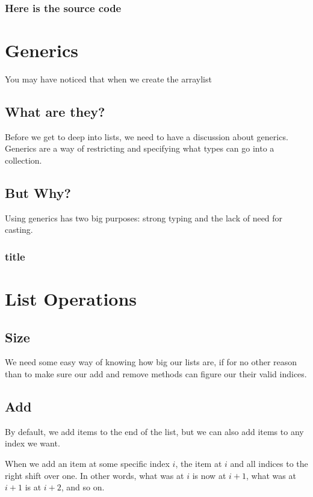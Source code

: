 \subsubsection*{Here is the source code}



\section{Generics}

You may have noticed that when we create the arraylist

\subsection{What are they?}


Before we get to deep into lists, we need to have a discussion about generics. Generics are a way of restricting and specifying what types can go into a collection.

\subsection{But Why?}


Using generics has two big purposes: strong typing and the lack of need for casting.


\subsubsection{title}


\section{List Operations}


\subsection{Size} We need some easy way of knowing how big our lists are, if for no other reason than to make sure our  add and remove methods can figure our their valid indices.


\subsection{Add}  By default, we add items to the end of the list, but we can also add items to any index we want.

When we add an item at some specific index $ i $, the item at $ i $ and all indices to the right shift over one.  In other words, what was at $ i $ is now at $ i+1 $, what was at $ i+1 $ is at $ i+2 $,  and so on.


